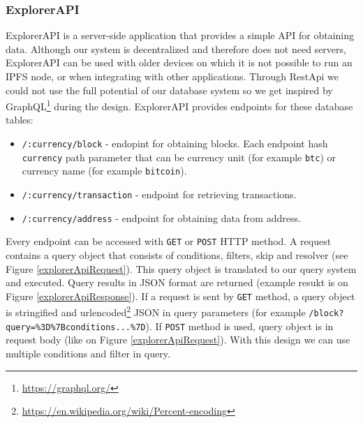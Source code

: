 \subsubsection{ExplorerAPI}
\label{explorerAPIroutes}
ExplorerAPI is a server-side application that provides a simple API for obtaining data. Although our system is decentralized and therefore does not need servers, ExplorerAPI can be used with older devices on which it is not possible to run an IPFS node, or when integrating with other applications. Through RestApi we could not use the full potential of our database system so we get inspired by GraphQL\footnote{\url{https://graphql.org/}} during the design. ExplorerAPI provides endpoints for these database tables:
\begin{itemize}
    \item \texttt{/:currency/block} - endopint for obtaining blocks. Each endpoint hash \texttt{currency} path parameter that can be currency unit (for example \texttt{btc}) or currency name (for example \texttt{bitcoin}).
    \item \texttt{/:currency/transaction} - endpoint for retrieving transactions.  
    \item \texttt{/:currency/address} - endpoint for obtaining data from address.
\end{itemize}
Every endpoint can be accessed with \texttt{GET} or \texttt{POST} HTTP method. A request contains a query object that consists of conditions, filters, skip and resolver (see Figure \ref{explorerApiRequest}). This query object is translated to our query system and executed. Query results in JSON format are returned (example resukt is on Figure \ref{explorerApiResponse}). If a request is sent by \texttt{GET} method, a query object is stringified and urlencoded\footnote{\url{https://en.wikipedia.org/wiki/Percent-encoding}} JSON in query parameters (for example \texttt{/block?query=\%3D\%7Bconditions...\%7D}). If \texttt{POST} method is used, query object is in request body (like on Figure \ref{explorerApiRequest}). With this design we can use multiple conditions and filter in query. 





